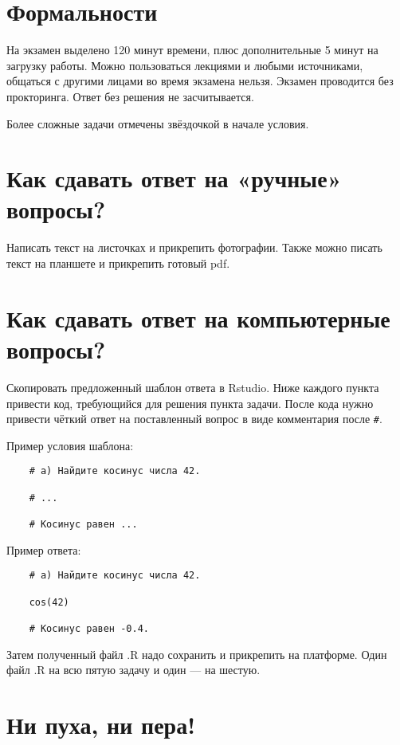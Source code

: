 \documentclass[12pt]{article}
\begin{document}
\section*{Формальности}

На экзамен выделено 120 минут времени, плюс дополнительные 5 минут на загрузку работы. 
Можно пользоваться лекциями и любыми источниками, общаться с другими лицами во 
время экзамена нельзя. Экзамен проводится без прокторинга.
Ответ без решения не засчитывается.  

Более сложные задачи отмечены звёздочкой в начале условия. 

\section*{Как сдавать ответ на «ручные» вопросы?}

Написать текст на листочках и прикрепить фотографии.
Также можно писать текст на планшете и прикрепить готовый pdf.


\section*{Как сдавать ответ на компьютерные вопросы?}

Скопировать предложенный шаблон ответа в Rstudio.
Ниже каждого пункта привести код, требующийся для решения пункта задачи. 
После кода нужно привести чёткий ответ на поставленный вопрос в виде комментария после \verb|#|.

Пример условия шаблона:

\begin{verbatim}
    # а) Найдите косинус числа 42.

    # ...

    # Косинус равен ...
\end{verbatim}    

Пример ответа:

\begin{verbatim}
    # а) Найдите косинус числа 42.

    cos(42)
    
    # Косинус равен -0.4.
\end{verbatim}

Затем полученный файл .R надо сохранить и прикрепить на платформе. 
Один файл .R на всю пятую задачу и один — на шестую. 


\section*{Ни пуха, ни пера!}
\end{document}
